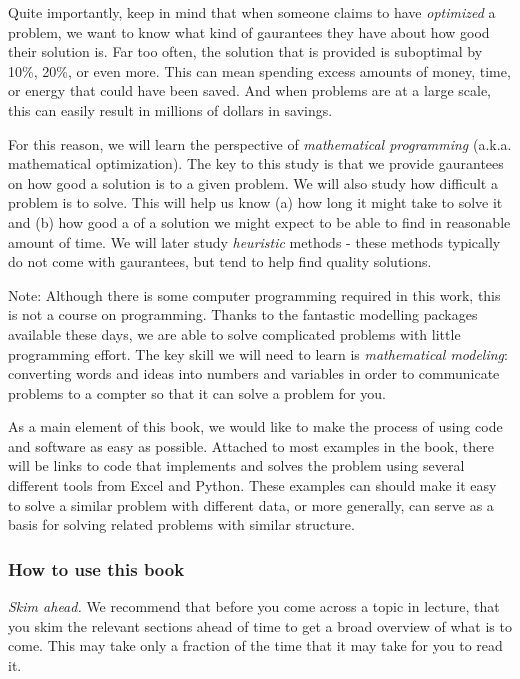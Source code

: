 Quite importantly, keep in mind that when someone claims to have \emph{optimized} a problem, we want to know what kind of gaurantees they have about how good their solution is.  Far too often, the solution that is provided is suboptimal by 10\%, 20\%, or even more.  This can mean spending excess amounts of money, time, or energy that could have been saved. And when problems are at a large scale, this can easily result in millions of dollars in savings.

For this reason, we will learn the perspective of \emph{mathematical programming} (a.k.a. mathematical optimization).  The key to this study is that we provide gaurantees on how good a solution is to a given problem.  We will also study how difficult a problem is to solve.  This will help us know (a) how long it might take to solve it and (b) how good a of a solution we might expect to be able to find in reasonable amount of time. We will later study \emph{heuristic} methods - these methods typically do not come with gaurantees, but tend to help find quality solutions.

Note: Although there is some computer programming required in this work, this is not a course on programming.   Thanks to the fantastic modelling packages available these days, we are able to solve complicated problems with little programming effort.   The key skill we will need to learn is \emph{mathematical modeling}: converting words and ideas into numbers and variables in order to communicate problems to a compter so that it can solve a problem for you.  

As a main element of this book, we would like to make the process of using code and software as easy as possible.  Attached to most examples in the book, there will be links to code that implements and solves the problem using several different tools from Excel and Python.  These examples can should make it easy to solve a similar problem with different data, or more generally, can serve as a basis for solving related problems with similar structure.

\subsubsection*{How to use this book}

\emph{Skim ahead.} We recommend that before you come across a topic in lecture, that you skim the relevant sections ahead of time to get a broad overview of what is to come.   This may take only a fraction of the time that it may take for you to read it.

